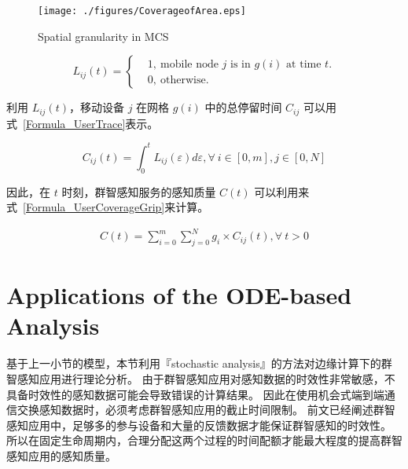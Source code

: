 \begin{figure}[!h]
  \centering
  \texttt{[image: ./figures/CoverageofArea.eps]}
  \vspace{-0.5em}
  \caption{Spatial granularity in MCS}
  \vspace{-0.5em}
  \label{Figure_CoverageofArea}
\end{figure}

\begin{equation}
  \label{Formula_LocationIJ}
  L_{ij}(t) = \left \{
  \begin{aligned}
  & 1,\ \text{mobile node $j$ is in $g(i)$ at time $t$.}\\
  & 0,\ \text{otherwise.}
  \end{aligned}
  \right.
\end{equation}

利用 $L_{ij}(t)$，移动设备 $j$ 在网格 $g(i)$ 中的总停留时间 $C_{ij}$ 可以用式~\eqref{Formula_UserTrace}表示。

\begin{equation}
  \label{Formula_UserTrace}
  C_{ij}(t) = \int_{0}^{t}L_{ij}(\varepsilon )d\varepsilon , \forall \ i \in [0,m], j \in [0,N]
\end{equation}

因此，在 $t$ 时刻，群智感知服务的感知质量 $C(t)$ 可以利用来式~\eqref{Formula_UserCoverageGrip}来计算。

\begin{equation}
  \label{Formula_UserCoverageGrip}
  \begin{gathered}
  C(t) = \sum^{m}_{i=0}\sum^{N}_{j=0} g_i \times C_{ij}(t), \forall \ t>0
  \end{gathered}
\end{equation}

\section{Applications of the ODE-based Analysis}

基于上一小节的模型，本节利用『stochastic analysis』的方法对边缘计算下的群智感知应用进行理论分析。
由于群智感知应用对感知数据的时效性非常敏感，不具备时效性的感知数据可能会导致错误的计算结果。
因此在使用机会式端到端通信交换感知数据时，必须考虑群智感知应用的截止时间限制。
前文已经阐述群智感知应用中，足够多的参与设备和大量的反馈数据才能保证群智感知的时效性。
所以在固定生命周期内，合理分配这两个过程的时间配额才能最大程度的提高群智感知应用的感知质量。

